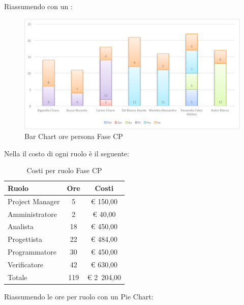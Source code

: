 				Riassumendo con un :
				\begin{figure}[H]\centering
					\includegraphics[width=\textwidth]{PianoDiProgetto/Pics/ChartOreFaseCP.pdf}
					\caption{Bar Chart ore persona Fase CP}
				\end{figure}
				Nella  il costo di ogni ruolo è il seguente:
				\begin{table}[H]
					\begin{center}
						\begin{tabular}{| l | c | c |}
							\hline
							Ruolo 				& Ore 		& Costi  \\ \hline
							
							Project Manager		& 5 		& \euro{} 150,00 	\\
							Amministratore 		& 2 		& \euro{} 40,00 	\\
							Analista	 		& 18 		& \euro{} 450,00 	\\
							Progettista 		& 22 		& \euro{} 484,00  	\\
							Programmatore		& 30 		& \euro{} 450,00 	\\
							Verificatore		& 42 		& \euro{} 630,00 	\\ \hline \hline
							
							Totale	 			& 119 		& \euro{} 2~204,00 	\\ \hline
						\end{tabular}
					\end{center}
					\caption{Costi per ruolo Fase CP}
				\end{table}
				Riassumendo le ore per ruolo con un Pie Chart:
